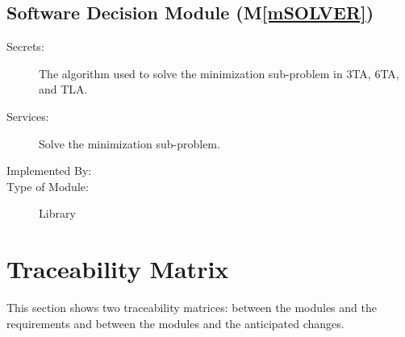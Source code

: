 \documentclass[12pt, titlepage]{article}
\newcommand{\mref}[1]{M\ref{#1}}
\begin{document}
\subsection{Software Decision Module (\mref{mSOLVER})}

\begin{description}
\item[Secrets:] The algorithm used to solve the minimization sub-problem
    in 3TA, 6TA, and TLA.
\item[Services:] Solve the minimization sub-problem.
\item[Implemented By:] 
\item[Type of Module:] Library
\end{description}

\section{Traceability Matrix} \label{SecTM}

This section shows two traceability matrices: between the modules and the
requirements and between the modules and the anticipated changes.
\end{document}
